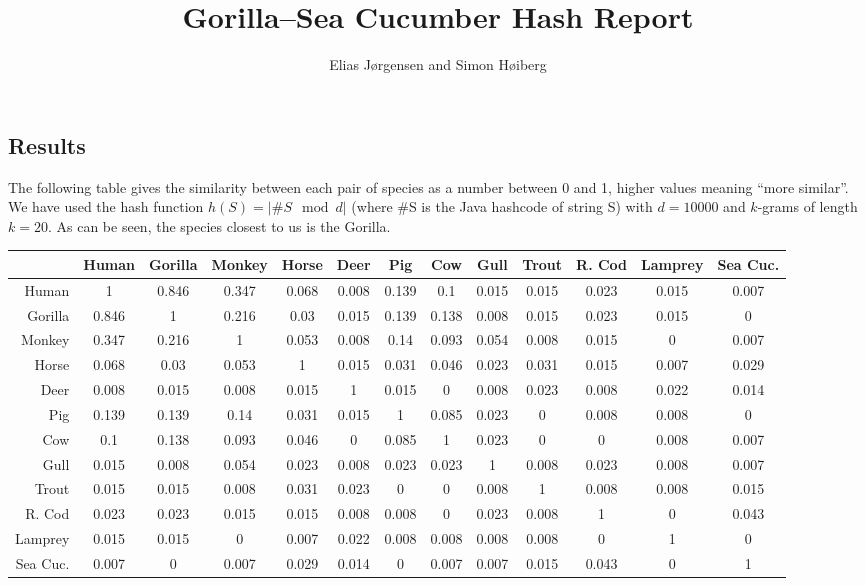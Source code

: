 \documentclass{tufte-handout}
\title{Gorilla--Sea Cucumber Hash Report}
\author{Elias Jørgensen and Simon Høiberg}
\begin{document}
\maketitle

  \subsection{Results}

  The following table gives the similarity between each pair of species as a number between 0 and 1, higher values meaning ``more similar''.
  We have used the hash function $h(S) = |\#S \mod{d}|$ (where \#S is the Java hashcode of string S) with  $d=10000$ and $k$-grams of length $k=20$.
  As can be seen, the species closest to us is the Gorilla.

  \bigskip\noindent
  {\small\sf
  \begin{tabular}{rcccccccccccc}
  \toprule
    &Human
    &Gorilla
    &Monkey
    &Horse
    &Deer
    &Pig
    &Cow
    &Gull
    &Trout
    &R. Cod
    &Lamprey
    &Sea Cuc.
    \\\midrule
  Human & 1 & 0.846 & 0.347 & 0.068 & 0.008 & 0.139 & 0.1 & 0.015 & 0.015 & 0.023 & 0.015 & 0.007 \\
  Gorilla & 0.846 & 1 & 0.216 & 0.03 & 0.015 & 0.139 & 0.138 & 0.008 & 0.015 & 0.023 & 0.015 & 0  \\
  Monkey & 0.347 & 0.216 & 1 & 0.053 & 0.008 & 0.14 & 0.093 & 0.054 & 0.008 & 0.015 & 0 & 0.007 \\
  Horse & 0.068 & 0.03 & 0.053 & 1 & 0.015 & 0.031 & 0.046 & 0.023 & 0.031 & 0.015 & 0.007 & 0.029 \\
  Deer & 0.008 & 0.015 & 0.008 & 0.015 & 1 & 0.015 & 0 & 0.008 & 0.023 & 0.008 & 0.022 & 0.014 \\
  Pig & 0.139 & 0.139 & 0.14 & 0.031 & 0.015 & 1 & 0.085 & 0.023 & 0 & 0.008 & 0.008 & 0 \\
  Cow & 0.1 & 0.138 & 0.093 & 0.046 & 0 & 0.085 & 1 & 0.023 & 0 & 0 & 0.008 & 0.007 \\
  Gull & 0.015 & 0.008 & 0.054 & 0.023 & 0.008 & 0.023 & 0.023 & 1  & 0.008 & 0.023 & 0.008 & 0.007 \\
  Trout & 0.015 & 0.015 & 0.008 & 0.031 & 0.023 & 0 & 0 & 0.008 & 1 & 0.008 & 0.008 & 0.015 \\
  R. Cod & 0.023 & 0.023 & 0.015 & 0.015 & 0.008 & 0.008 & 0 & 0.023 & 0.008 & 1 & 0 & 0.043 \\
  Lamprey & 0.015 & 0.015 & 0 & 0.007 & 0.022 & 0.008 & 0.008 & 0.008 & 0.008 & 0 & 1 & 0 \\
  Sea Cuc. & 0.007 & 0 & 0.007 & 0.029 & 0.014 & 0 & 0.007 & 0.007  & 0.015 & 0.043 & 0 & 1 \\
  \bottomrule
  \end{tabular}
  }
\end{document}
